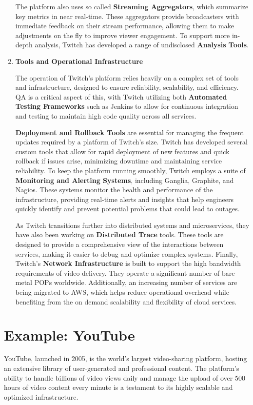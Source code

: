 \begin{enumerate}
    The platform also uses so called \textbf{Streaming Aggregators}, which summarize key metrics in near real-time. These aggregators provide broadcasters with immediate feedback on their stream performance, allowing them to make adjustments on the fly to improve viewer engagement. To support more in-depth analysis, Twitch has developed a range of undisclosed \textbf{Analysis Tools}.

    \item \textbf{Tools and Operational Infrastructure}

    The operation of Twitch’s platform relies heavily on a complex set of tools and infrastructure, designed to ensure reliability, scalability, and efficiency. \ac{QA} is a critical aspect of this, with Twitch utilizing both \textbf{Automated Testing Frameworks} such as Jenkins to allow for continuous integration and testing to maintain high code quality across all services.

    \textbf{Deployment and Rollback Tools} are essential for managing the frequent updates required by a platform of Twitch’s size. Twitch has developed several custom tools that allow for rapid deployment of new features and quick rollback if issues arise, minimizing downtime and maintaining service reliability. To keep the platform running smoothly, Twitch employs a suite of \textbf{Monitoring and Alerting Systems}, including Ganglia, Graphite, and Nagios. These systems monitor the health and performance of the infrastructure, providing real-time alerts and insights that help engineers quickly identify and prevent potential problems that could lead to outages.

    As Twitch transitions further into distributed systems and microservices, they have also been working on \textbf{Distributed Trace} tools. These tools are designed to provide a comprehensive view of the interactions between services, making it easier to debug and optimize complex systems. Finally, Twitch’s \textbf{Network Infrastructure} is built to support the high bandwidth requirements of video delivery. They operate a significant number of bare-metal \ac{POPs} worldwide. Additionally, an increasing number of services are being migrated to \ac{AWS}, which helps reduce operational overhead while benefiting from the on demand scalability and flexibility of cloud services.

\end{enumerate}

\section{Example: YouTube}
YouTube, launched in 2005, is the world's largest video-sharing platform, hosting an extensive library of user-generated and professional content. The platform's ability to handle billions of video views daily and manage the upload of over 500 hours of video content every minute is a testament to its highly scalable and optimized infrastructure\cite{youtube_infrastructure}.

